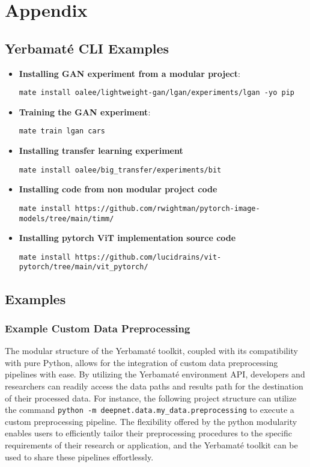 

\onecolumn

\section{Appendix}



\subsection{Yerbamaté CLI Examples}

\begin{itemize}
    \item \textbf{Installing GAN experiment from a modular project}: 
    
    \texttt{mate install oalee/lightweight-gan/lgan/experiments/lgan -yo pip}
    \item \textbf{Training the GAN experiment}: 
    
    \texttt{mate train lgan cars}
    
    \item \textbf{Installing transfer learning experiment}

    \texttt{mate install oalee/big\_transfer/experiments/bit}
    
    \item \textbf{Installing code from non modular project code}

    \texttt{mate install https://github.com/rwightman/pytorch-image-models/tree/main/timm/}

    \item \textbf{Installing pytorch ViT implementation source code}
    
    \texttt{mate install https://github.com/lucidrains/vit-pytorch/tree/main/vit\_pytorch/}

\end{itemize}


\subsection{Examples}

\subsubsection{Example Custom Data Preprocessing}
The modular structure of the Yerbamaté toolkit, coupled with its compatibility with pure Python, allows for the integration of custom data preprocessing pipelines with ease. By utilizing the Yerbamaté environment API, developers and researchers can readily access the data paths and results path for the destination of their processed data. For instance, the following project structure can utilize the command \texttt{python -m deepnet.data.my\_data.preprocessing} to execute a custom preprocessing pipeline. The flexibility offered by the python modularity enables users to efficiently tailor their preprocessing procedures to the specific requirements of their research or application, and the Yerbamaté toolkit can be used to share these pipelines effortlessly.

